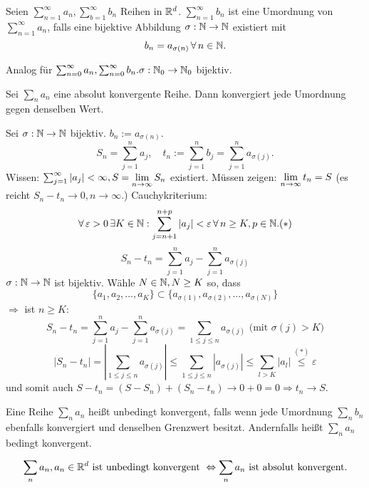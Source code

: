 \documentclass[../ana1.tex]{subfiles}
\begin{document}
\begin{defi}[Umordnung]
    Seien \( \sum_{n=1}^\infty a_n, \sum_{b=1}^\infty b_n \) Reihen in \( \mathbb{R}^d \). \( \sum_{n=1}^\infty b_n \) ist eine Umordnung von \( \sum_{n=1}^\infty a_n \), falls eine bijektive Abbildung \( \sigma:\mathbb{N}\rightarrow\mathbb{N} \) existiert mit
    \[ b_n = a_{\sigma(n)} \,\forall \, n\in\mathbb{N}. \]
\end{defi}
\begin{bem}
    Analog für \( \sum_{n=0}^\infty a_n, \sum_{n=0}^\infty b_n. \sigma: \mathbb{N}_0 \rightarrow \mathbb{N}_0 \) bijektiv.
\end{bem}
\begin{satz}[Umordnungssatz]
    Sei \( \sum_n a_n \) eine absolut konvergente Reihe. Dann konvergiert jede Umordnung gegen denselben Wert.
\end{satz}
\begin{bew}
    Sei \( \sigma : \mathbb{N}\rightarrow\mathbb{N} \) bijektiv. \( b_n := a_{\sigma(n)} \).
    \[ S_n = \sum_{j=1}^n a_j, \quad t_n := \sum_{j=1}^n b_j = \sum_{j=1}^n a_{\sigma(j)}. \]
    Wissen: \( \sum_{j=1}^\infty |a_j| < \infty, S = \lim\limits_{n\rightarrow\infty} S_n \) existiert.
    Müssen zeigen: \( \lim\limits_{n\rightarrow\infty} t_n = S \) (es reicht \( S_n - t_n \rightarrow 0, n\rightarrow\infty \).)
    Cauchykriterium: 
    \[ \forall \, \varepsilon > 0 \, \exists K\in\mathbb{N}: \sum_{j=n+1}^{n+p} |a_j| < \varepsilon \,\forall \, n\geq K, p\in\mathbb{N}. (*) \]
    \[ S_n - t_n = \sum_{j=1}^n a_j - \sum_{j=1}^n a_{\sigma(j)} \]
    \( \sigma : \mathbb{N}\rightarrow\mathbb{N} \) ist bijektiv. Wähle \( N\in\mathbb{N}, N\geq K \) so, dass
    \[ \{ a_1, a_2, \ldots, a_K \} \subset \{ a_{\sigma(1)}, a_{\sigma(2)}, \ldots, a_{\sigma(N)} \} \]
    \( \Rightarrow \) ist \( n\geq K \):
    \[ S_n - t_n = \sum_{j=1}^n a_j - \sum_{j=1}^n a_{\sigma(j)} = \sum_{1\leq j \leq n} a_{\sigma(j)} \text{ (mit } \sigma(j) > K\text{)} \]
    \[ |S_n - t_n| = \left| \sum_{1\leq j \leq n} a_{\sigma(j)} \right| \leq \sum_{1\leq j \leq n} | a_{\sigma(j)} | \leq \sum_{l>K} |a_l| \overset{(*)}{\leq}\varepsilon \]
    und somit auch \( S - t_n = (S-S_n) + (S_n - t_n) \rightarrow 0 + 0 = 0 \Rightarrow t_n \rightarrow S \).
\end{bew}
\begin{bem}
    Eine Reihe \( \sum_n a_n \) heißt unbedingt konvergent, falls wenn jede Umordnung \( \sum_n b_n \) ebenfalls konvergiert und denselben Grenzwert besitzt. Andernfalls heißt \( \sum_n a_n \) bedingt konvergent.
\end{bem}
\begin{satz*}[Dirichlet 1837]
    \[ \sum_n a_n, a_n \in\mathbb{R}^d \text{ ist unbedingt konvergent } \Leftrightarrow \sum_n a_n \text{ ist absolut konvergent.} \]
\end{satz*}
\end{document}
